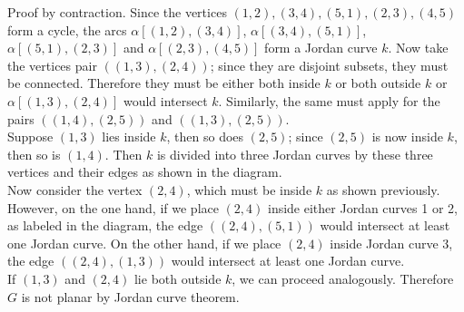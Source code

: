 \documentclass{article}
\begin{document}
\begin{itemize}
\begin{enumerate}
\begin{center}
                    \end{center}
                    Proof by contraction. Since the vertices $(1,2),(3,4),(5,1),(2,3),(4,5)$ form a cycle, the arcs $\alpha[(1,2),(3,4)]$, $\alpha[(3,4),(5,1)]$, $\alpha[(5,1),(2,3)]$ and $\alpha[(2,3),(4,5)]$ form a Jordan curve $k$. Now take the vertices pair $((1,3),(2,4))$; since they are disjoint subsets, they must be connected. Therefore they must be either both inside $k$ or both outside $k$ or $\alpha[(1,3),(2,4)]$ would intersect $k$. Similarly, the same must apply for the pairs $((1,4),(2,5))$ and $((1,3),(2,5))$.\\
                    Suppose $(1,3)$ lies inside $k$, then so does $(2,5)$; since $(2,5)$ is now inside $k$, then so is $(1,4)$. Then $k$ is divided into three Jordan curves by these three vertices and their edges as shown in the diagram.\\
                    Now consider the vertex $(2,4)$, which must be inside $k$ as shown previously. However, on the one hand, if we place $(2,4)$ inside either Jordan curves 1 or 2, as labeled in the diagram, the edge $((2,4),(5,1))$ would intersect at least one Jordan curve. On the other hand, if we place $(2,4)$ inside Jordan curve 3, the edge $((2,4),(1,3))$ would intersect at least one Jordan curve.\\
                    If $(1,3)$ and $(2,4)$ lie both outside $k$, we can proceed analogously. Therefore $G$ is not planar by Jordan curve theorem.
                    
          \end{enumerate}
\end{itemize}
\end{document}
